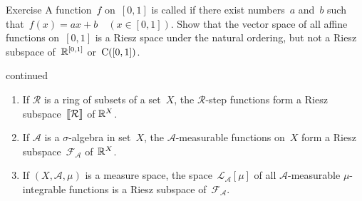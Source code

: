 \documentclass[main.tex]{subfiles}
\begin{document}
%
%
\begin{psec}{Exercise}
\label{1.7}
A function~$f$ on~$[0,1]$ is called 
if there exist numbers~$a$ and~$b$ 
such that~$f(x)=ax+b\quad (x\in[0,1])$.
Show that the vector space of all affine functions on~$[0,1]$
is a Riesz space under the natural ordering,
but not a Riesz subspace of~$\mathbb{R}^{[0,1]}$ or~$\mathrm{C}([0,1])$.
\end{psec}
%
%
\begin{psec}[1.5]{continued}
\label{1.5_3}
\begin{enumerate}
\setcounter{enumi}{\value{list-1.5}}
\item
\label{1.5-7}
If $\mathcal{R}$ is a ring of subsets of a set~$X$,
the $\mathcal{R}$-step functions form a 
Riesz subspace~$\lbb \mathcal{R} \rbb$ of $\mathbb{R}^X$.
%
\item
\label{1.5-8}
If $\mathcal{A}$ is a $\sigma$-algebra 
in set~$X$,
the $\mathcal A$-measurable functions on~$X$
form a Riesz subspace~$\mathcal F_{\mathcal A}$ of~$\mathbb{R}^X$.
%
\item
\label{1.5-9}
If $(X,\mathcal A,\mu)$ is a measure space,
the space~$\mathcal L_{\mathcal A}[\mu]$
of all $\mathcal A$-measurable 
$\mu$-integrable functions is a Riesz subspace
of~$\mathcal F_{\mathcal A}$.
\end{enumerate}
\end{psec}
%
%
\end{document}
